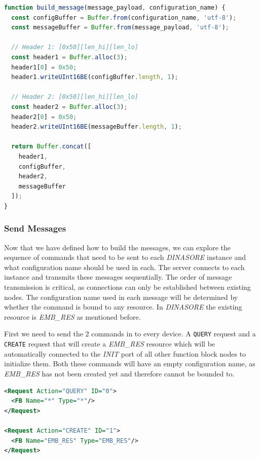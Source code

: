 \begin{lstlisting}[language=JavaScript, caption={build\_message() in JavaScript}, label={lst:build-message-js}]
function build_message(message_payload, configuration_name) {
  const configBuffer = Buffer.from(configuration_name, 'utf-8');
  const messageBuffer = Buffer.from(message_payload, 'utf-8');

  // Header 1: [0x50][len_hi][len_lo]
  const header1 = Buffer.alloc(3);
  header1[0] = 0x50;
  header1.writeUInt16BE(configBuffer.length, 1);

  // Header 2: [0x50][len_hi][len_lo]
  const header2 = Buffer.alloc(3);
  header2[0] = 0x50;
  header2.writeUInt16BE(messageBuffer.length, 1);

  return Buffer.concat([
    header1,
    configBuffer,
    header2,
    messageBuffer
  ]);
}
\end{lstlisting}

\subsubsection{Send Messages} \label{subsubsec:send-messages}
Now that we have defined how to build the messages, we can explore the sequence of commands that need to be sent to each \textit{DINASORE} instance and what configuration name should be used in each. The server connects to each instance and transmits these messages sequentially. The order of message transmission is critical, as connections can only be established between existing nodes. The configuration name used in each message will be determined by whether the command is bound to any resource. In \textit{DINASORE} the existing resource is \textit{EMB\_RES} as mentioned before.

First we need to send the 2 commands in  to every device. A \texttt{QUERY} request and a \texttt{CREATE} request that will create a \textit{EMB\_RES} resource which will be automatically connected to the \textit{INIT} port of all other function block nodes to initialize them. Both these commands will have an empty configuration name, as \textit{EMB\_RES} has not been created yet and therefore cannot be bounded to.

\begin{lstlisting}[language=XML, caption={Setup deployment commands}, label={lst:deploy-setup}]
<Request Action="QUERY" ID="0">
  <FB Name="*" Type="*"/>
</Request>

<Request Action="CREATE" ID="1">
  <FB Name="EMB_RES" Type="EMB_RES"/>
</Request>
\end{lstlisting}

